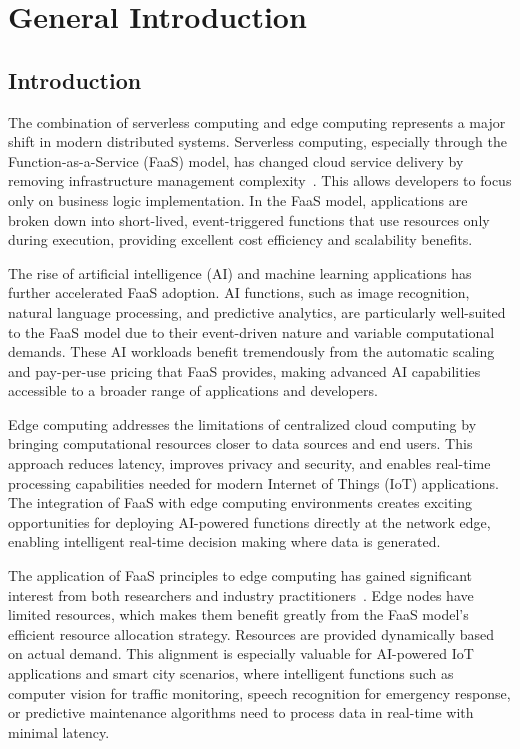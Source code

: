 \chapter{General Introduction}

\section{Introduction}

The combination of serverless computing and edge computing represents a major shift in modern distributed systems. Serverless computing, especially through the Function-as-a-Service (FaaS) model, has changed cloud service delivery by removing infrastructure management complexity~\cite{baldini2017serverless}. This allows developers to focus only on business logic implementation. In the FaaS model, applications are broken down into short-lived, event-triggered functions that use resources only during execution, providing excellent cost efficiency and scalability benefits.

The rise of artificial intelligence (AI) and machine learning applications has further accelerated FaaS adoption. AI functions, such as image recognition, natural language processing, and predictive analytics, are particularly well-suited to the FaaS model due to their event-driven nature and variable computational demands. These AI workloads benefit tremendously from the automatic scaling and pay-per-use pricing that FaaS provides, making advanced AI capabilities accessible to a broader range of applications and developers.

Edge computing addresses the limitations of centralized cloud computing by bringing computational resources closer to data sources and end users. This approach reduces latency, improves privacy and security, and enables real-time processing capabilities needed for modern Internet of Things (IoT) applications. The integration of FaaS with edge computing environments creates exciting opportunities for deploying AI-powered functions directly at the network edge, enabling intelligent real-time decision making where data is generated.

The application of FaaS principles to edge computing has gained significant interest from both researchers and industry practitioners~\cite{aslanpour2021serverless}. Edge nodes have limited resources, which makes them benefit greatly from the FaaS model's efficient resource allocation strategy. Resources are provided dynamically based on actual demand. This alignment is especially valuable for AI-powered IoT applications and smart city scenarios, where intelligent functions such as computer vision for traffic monitoring, speech recognition for emergency response, or predictive maintenance algorithms need to process data in real-time with minimal latency.

